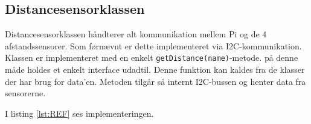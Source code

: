 \subsection{Distancesensorklassen}

Distancesensorklassen håndterer alt kommunikation mellem Pi og de 4 afstandssensorer. Som førnævnt er dette implementeret via I2C-kommunikation. Klassen er implementeret med en enkelt \texttt{getDistance(name)}-metode. på denne måde holdes et enkelt interface udadtil. Denne funktion kan kaldes fra de klasser der har brug for data'en. Metoden tilgår så internt I2C-bussen og henter data fra sensorerne.  

I listing \ref{lst:REF} ses implementeringen.


